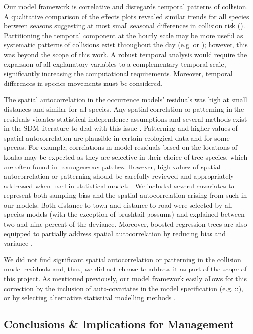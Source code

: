 Our model framework is correlative and disregards temporal patterns of collision.  A qualitative comparison of the effects plots revealed similar trends for all species between seasons suggesting at most small seasonal differences in collision risk (). Partitioning the temporal component at the hourly scale may be more useful as systematic patterns of collisions exist throughout the day (e.g. \cite{litv08} or \cite{rhod14}); however, this was beyond the scope of this work.  A robust temporal analysis would require the expansion of all explanatory variables to a complementary temporal scale, significantly increasing the computational requirements.  Moreover, temporal differences in species movements  must be considered.

The spatial autocorrelation in the occurrence models' residuals was high at small distances and similar for all species.  Any spatial correlation or patterning in the residuals violates statistical independence assumptions and several methods exist in the SDM literature to deal with this issue \citep{augu96,dorm07,dorm13}.  Patterning and higher values of spatial autocorrelation are plausible in certain ecological data and for some species.  For example, correlations in model residuals based on the locations of koalas may be expected as they are selective in their choice of tree species, which are often found in homogeneous patches.  However, high values of spatial autocorrelation or patterning should be carefully reviewed and appropriately addressed when used in statistical models \citep{wint06}.  We included several covariates to represent both sampling bias and the spatial autocorrelation arising from such in our models.  Both distance to town and distance to road were selected by all species models (with the exception of brushtail possums) and explained between two and nine percent of the deviance.  Moreover, boosted regression trees are also equipped to partially address spatial autocorrelation by reducing bias and variance \citep{elit08}.

We did not find significant spatial autocorrelation or patterning in the collision model residuals and, thus, we did not choose to address it as part of the scope of this project.  As mentioned previously, our model framework easily allows for this correction by the inclusion of auto-covariates in the model specification (e.g. \cite{dwye16};\cite{farm12};\cite{gome08}), or by selecting alternative statistical modelling methods \citep{zhan05}.

\subsection{Conclusions \& Implications for Management}

